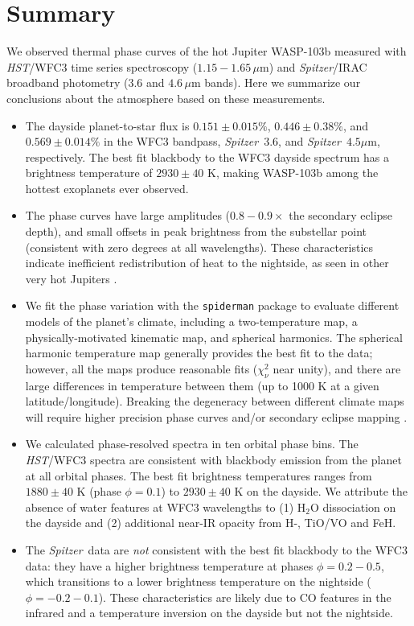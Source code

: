 \documentclass[twocolumn, trackchanges]{aastex61}
\newcommand{\project}[1]{\textsl{#1}}
\newcommand{\HST}{\project{HST}}
\newcommand{\Spitzer}{\project{Spitzer}}
\begin{document}
\section{Summary}
\label{sec:summary}
We observed thermal phase curves of the hot Jupiter WASP-103b measured with \HST/WFC3 time series spectroscopy ($1.15 - 1.65\,\mu$m) and \Spitzer/IRAC broadband photometry ($3.6$ and $4.6\,\mu$m bands). Here we summarize our conclusions about the atmosphere based on these measurements.

\begin{itemize}
	\item{The dayside planet-to-star flux is $0.151\pm0.015\%$, $0.446\pm0.38\%$, and $0.569\pm0.014\%$ in the WFC3 bandpass, \Spitzer\ $3.6$, and \Spitzer\ $4.5\mu$m, respectively.  The best fit blackbody to the WFC3 dayside spectrum has a brightness temperature of $2930 \pm 40$ K, making WASP-103b among the hottest exoplanets ever observed.}
	\item{The phase curves have large amplitudes ($0.8 -0.9\times$ the secondary eclipse depth), and small offsets in peak brightness from the substellar point (consistent with zero degrees at all wavelengths). These characteristics indicate inefficient redistribution of heat to the nightside, as seen in other very hot Jupiters \citep{komacek17}.} 
	\item{We fit the phase variation with the \texttt{spiderman} package \citep{louden17} to evaluate different models of the planet's climate, including a two-temperature map, a physically-motivated kinematic map, and spherical harmonics. The spherical harmonic temperature map generally provides the best fit to the data; however, all the maps produce reasonable fits ($\chi^2_\nu$ near unity), and there are large differences in temperature between them (up to 1000 K at a given latitude/longitude). Breaking the degeneracy between different climate maps will require higher precision phase curves and/or secondary eclipse mapping \citep[e.g.][]{dewit12}.}
\item{We calculated phase-resolved spectra in ten orbital phase bins. The \HST/WFC3 spectra are consistent with  blackbody emission from the planet at all orbital phases. The best fit brightness temperatures ranges from $1880\pm40$ K (phase $\phi = 0.1$) to $2930\pm40$ K on the dayside. We attribute the absence of water features at WFC3 wavelengths to (1) H$_2$O dissociation on the dayside and (2) additional near-IR opacity from H-, TiO/VO and FeH.}
\item{The \Spitzer\ data are \emph{not} consistent with the best fit blackbody to the WFC3 data: they have a higher brightness temperature at phases $\phi = 0.2 - 0.5$, which transitions to a lower brightness temperature on the nightside ($\phi = -0.2 - 0.1$). These characteristics are likely due to CO features in the infrared and a temperature inversion on the dayside but not the nightside.}

\end{itemize}
\end{document}
